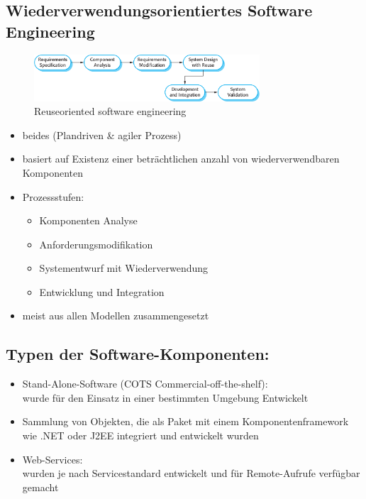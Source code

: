 \subsection{Wiederverwendungsorientiertes Software Engineering}
\begin{figure}[h] 
  \centering
     \includegraphics[width=0.75\textwidth]{mainmatter/pics/reused.png}
  \caption{Reuseoriented software engineering}
\end{figure}


\begin{itemize}
    \item beides (Plandriven \& agiler Prozess)
    \item basiert auf Existenz einer beträchtlichen anzahl von wiederverwendbaren Komponenten 
    \item Prozessstufen: 
    \begin{itemize}
        \item Komponenten Analyse
        \item Anforderungsmodifikation
        \item Systementwurf mit Wiederverwendung 
        \item Entwicklung und Integration
    \end{itemize}
    \item meist aus allen Modellen zusammengesetzt
\end{itemize}

\subsection{Typen der Software-Komponenten:}
\begin{itemize}
    \item Stand-Alone-Software (COTS Commercial-off-the-shelf):\\
    wurde für den Einsatz in einer bestimmten Umgebung Entwickelt
    \item Sammlung von Objekten, die als Paket mit einem Komponentenframework wie .NET oder J2EE integriert und entwickelt wurden
    \item Web-Services:\\
    wurden je nach Servicestandard entwickelt und für Remote-Aufrufe verfügbar gemacht
\end{itemize}

